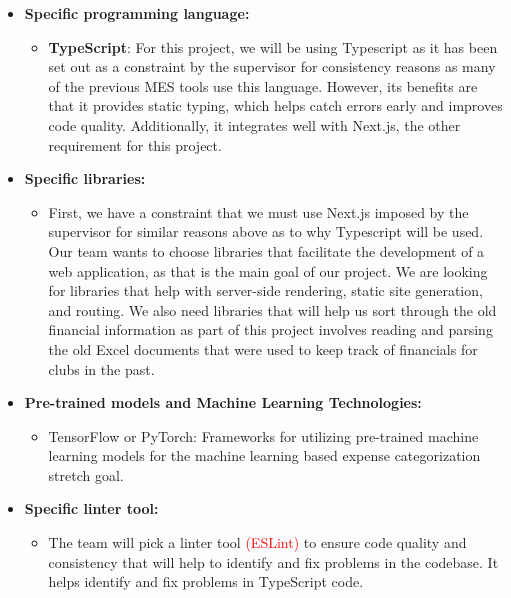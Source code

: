 \documentclass{article}
\begin{document}
\begin{itemize}
  \item \textbf{Specific programming language:}
  \begin{itemize}
      \item \textbf{TypeScript}: For this project, we will be using Typescript as it has been set out as a constraint by the supervisor for consistency reasons as many of the previous MES tools use this language. However, its benefits are that it provides static typing, which helps catch errors early and improves code quality. Additionally, it integrates well with Next.js, the other requirement for this project.
  \end{itemize}

  \item \textbf{Specific libraries:}

  \begin{itemize}
    \item First, we have a constraint that we must use Next.js imposed by the supervisor for similar reasons above as to why Typescript will be used. Our team wants to choose libraries that facilitate the development of a web application, as that is the main goal of our project. We are looking for libraries that help with server-side rendering, static site generation, and routing. We also need libraries that will help us sort through the old financial information as part of this project involves reading and parsing the old Excel documents that were used to keep track of financials for clubs in the past.
  \end{itemize}

  \item \textbf{Pre-trained models and Machine Learning Technologies:}
  \begin{itemize}
      \item TensorFlow or PyTorch: Frameworks for utilizing pre-trained machine learning models for the machine learning based expense categorization stretch goal.
  \end{itemize}

  \item \textbf{Specific linter tool:}
  \begin{itemize}
    \item The team will pick a linter tool \textcolor{red}{(ESLint)} to ensure code quality and consistency that will help to identify and fix problems in the codebase. It helps identify and fix problems in TypeScript code.
  \end{itemize}


\end{itemize}
\end{document}
